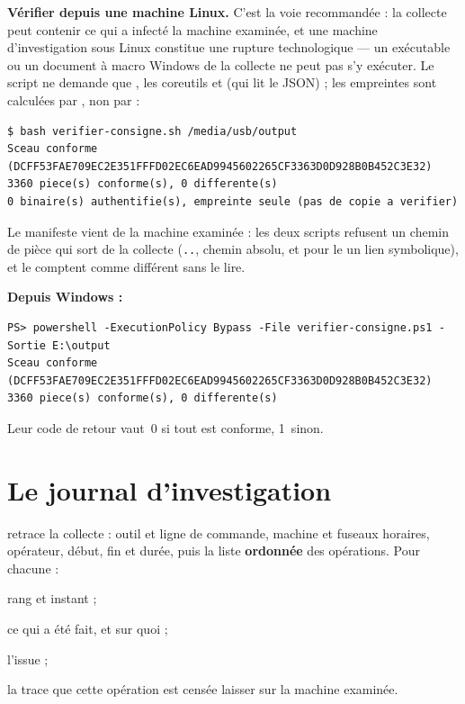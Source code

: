 \documentclass[11pt,a4paper,oneside]{report}
\begin{document}
\textbf{Vérifier depuis une machine Linux.} C'est la voie recommandée : la
collecte peut contenir ce qui a infecté la machine examinée, et une machine
d'investigation sous Linux constitue une rupture technologique — un exécutable
ou un document à macro Windows de la collecte ne peut pas s'y exécuter. Le
script ne demande que , les coreutils et  (qui
lit le JSON) ; les empreintes sont calculées par , non par
\wac{} :

\begin{lstlisting}
$ bash verifier-consigne.sh /media/usb/output
Sceau conforme (DCFF53FAE709EC2E351FFFD02EC6EAD9945602265CF3363D0D928B0B452C3E32)
3360 piece(s) conforme(s), 0 differente(s)
0 binaire(s) authentifie(s), empreinte seule (pas de copie a verifier)
\end{lstlisting}

Le manifeste vient de la machine examinée : les deux scripts refusent un
chemin de pièce qui sort de la collecte (\texttt{..}, chemin absolu, et pour
le  un lien symbolique), et le comptent comme différent sans le
lire.

\textbf{Depuis Windows :}

\begin{lstlisting}
PS> powershell -ExecutionPolicy Bypass -File verifier-consigne.ps1 -Sortie E:\output
Sceau conforme (DCFF53FAE709EC2E351FFFD02EC6EAD9945602265CF3363D0D928B0B452C3E32)
3360 piece(s) conforme(s), 0 differente(s)
\end{lstlisting}

Leur code de retour vaut~0 si tout est conforme, 1~sinon.





\section{Le journal d'investigation}

 retrace la collecte : outil et ligne de commande,
machine et fuseaux horaires, opérateur, début, fin et durée, puis la liste
\textbf{ordonnée} des opérations. Pour chacune :

\begin{description}[style=nextline,leftmargin=1.2em]
  \item[\champ{Seq}, \champ{TimestampUtc}, \champ{TimestampLocal}] rang et instant ;
  \item[\champ{Operation}, \champ{Target}] ce qui a été fait, et sur quoi ;
  \item[\champ{Result}] l'issue ;
  \item[\champ{Footprint}] la trace que cette opération est censée laisser sur la
        machine examinée.
\end{description}
\end{document}
